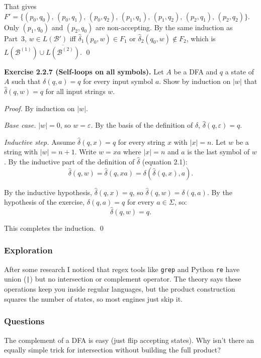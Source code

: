 \documentclass{article}
\theoremstyle{theorem}
\theoremstyle{definition}
\theoremstyle{remark}
\begin{document}
That gives $F' = \{(p_0,q_0),\, (p_0,q_1),\, (p_0,q_2),\, (p_1,q_1),\, (p_1,q_2),\, (p_2,q_1),\, (p_2,q_2)\}$. Only $(p_1, q_0)$ and $(p_2, q_0)$ are non-accepting. By the same induction as Part~3, $w \in L(\mathcal{B}')$ iff $\hat\delta_1(p_0,w) \in F_1$ or $\hat\delta_2(q_0,w) \notin F_2$, which is $L(\mathcal{B}^{(1)}) \cup \overline{L(\mathcal{B}^{(2)})}$. \qed

\bigskip

\textbf{Exercise 2.2.7 (Self-loops on all symbols).}
Let $A$ be a DFA and $q$ a state of $A$ such that $\delta(q, a) = q$ for every input symbol $a$. Show by induction on $|w|$ that $\hat\delta(q, w) = q$ for all input strings $w$.

\emph{Proof.} By induction on $|w|$.

\emph{Base case.} $|w| = 0$, so $w = \varepsilon$. By the basis of the definition of $\hat\delta$, $\hat\delta(q, \varepsilon) = q$. \checkmark

\emph{Inductive step.} Assume $\hat\delta(q, x) = q$ for every string $x$ with $|x| = n$. Let $w$ be a string with $|w| = n + 1$. Write $w = xa$ where $|x| = n$ and $a$ is the last symbol of $w$. By the inductive part of the definition of $\hat\delta$ (equation 2.1):
\[
  \hat\delta(q, w) = \hat\delta(q, xa) = \delta(\hat\delta(q, x), a).
\]

By the inductive hypothesis, $\hat\delta(q, x) = q$, so $\hat\delta(q, w) = \delta(q, a)$. By the hypothesis of the exercise, $\delta(q, a) = q$ for every $a \in \Sigma$, so:
\[
  \hat\delta(q, w) = q.
\]

This completes the induction. \qed

\subsubsection{Exploration}

After some research I noticed that regex tools like \texttt{grep} and Python \texttt{re} have union (\texttt{|}) but no intersection or complement operator. The theory says these operations keep you inside regular languages, but the product construction squares the number of states, so most engines just skip it.

\subsubsection{Questions}

The complement of a DFA is easy (just flip accepting states). Why isn't there an equally simple trick for intersection without building the full product?
\end{document}
